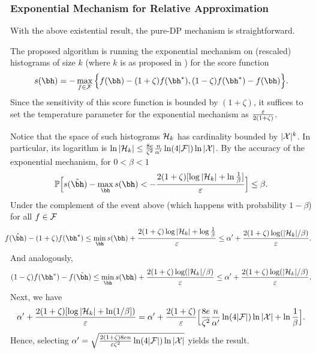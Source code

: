 \subsubsection{Exponential Mechanism for Relative Approximation}

With the above existential result, the pure-DP mechanism is straightforward. 

\begin{proofof}{}
The proposed algorithm is running the exponential mechanism on (rescaled) histograms of size $k$ (where $k$ is as proposed in ) for the score function
\[ s(\bh) = -\max_{f\in {\cal F}} \Big\{f(\bh) - (1+\zeta)f(\bh^{\ast}),(1-\zeta)f(\bh^{\ast})-f(\bh )\Big\}. \]
Since the sensitivity of this score function is bounded by $(1+\zeta)$, it suffices to set the temperature parameter for the exponential mechanism as $\frac{\varepsilon}{2(1+\zeta)}$.

Notice that the space of such histograms ${\cal H}_k$ has cardinality bounded by $|{\cal X}|^{k}$. In particular, its logarithm is $\ln|{\cal H}_k|\leq \frac{8e}{\zeta^2}\frac{n}{\alpha'}\ln(4|{\cal F}|)\ln|{\cal X}|$. By the accuracy of the exponential mechanism, for $0<\beta<1$
\[ \mathbb{P}\Big[s(\hat\bh)-\max_{\bh}s(\bh) < -\frac{2(1+\zeta)[\log|{\cal H}_k|+\ln\frac{1}{\beta}]}{\varepsilon} \Big] \leq \beta.\]
Under the complement of the event above (which happens with probability $1-\beta$)
for all $f\in {\cal F}$ 
\[
\hspace{-0.3cm}f(\hbh)-(1+\zeta)f(\bh^{\ast}) \leq \min_{\bh}s(\bh) + \frac{2(1+\zeta)\log|{\cal H}_k|+\log\frac{1}{\beta}}{\varepsilon} \\
\leq \alpha'+ \frac{2(1+\zeta)\log(|{\cal H}_k|/\beta)}{\varepsilon}.
\]
And analogously,
\[
(1-\zeta)f(\bh^{\ast}) - f(\hbh)
\leq \min_{\bh}s(\bh)+ \frac{2(1+\zeta)\log(|{\cal H}_k|/\beta)}{\varepsilon} 
\leq \alpha'+ \frac{2(1+\zeta)\log(|{\cal H}_k|/\beta)}{\varepsilon}.
\]
Next, we have 
\[
\alpha'+ \frac{2(1+\zeta)[\log|{\cal H}_k|+\ln(1/\beta])}{\varepsilon} 
=\alpha'+\frac{2(1+\zeta)}{\varepsilon}\Big[ \frac{8e}{\zeta^2}\frac{n}{\alpha'}\ln(4|{\cal F}|)\ln|{\cal X}|+\ln\frac{1}{\beta}\Big].
\]
Hence, selecting $\alpha'=\sqrt{\frac{2(1+\zeta)8e n}{\varepsilon \zeta^2}\ln(4|{\cal F}|)\ln|{\cal X}|}$ yields the result.
\end{proofof}